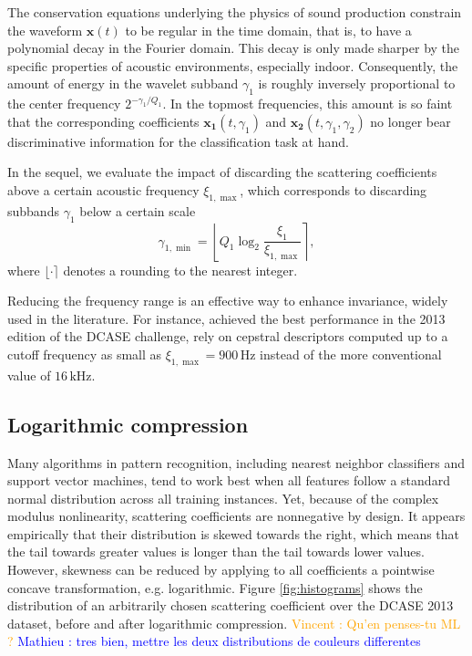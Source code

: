 \documentclass[journal]{IEEEtran}
\makeatletter
\newcommand*{\eg}{e.g.\@\xspace}
\newcommand{\vl}[1]{\textcolor{orange}{Vincent : #1}}
\newcommand{\ml}[1]{\textcolor{blue}{ Mathieu : #1}}
\makeatother
\begin{document}
The conservation equations underlying the physics of sound production constrain the waveform $\boldsymbol{x}(t)$ to be regular in the time domain, that is, to have a polynomial decay in the Fourier domain.
This decay is only made sharper by the specific properties of acoustic environments, especially indoor.
Consequently, the amount of energy in the wavelet subband $\gamma_1$ is roughly inversely proportional to the center frequency $2^{-\gamma_1/Q_1}$.
In the topmost frequencies, this amount is so faint that the corresponding coefficients $\boldsymbol{x_1}(t,\gamma_1)$ and $\boldsymbol{x_2}(t,\gamma_1,\gamma_2)$ no longer bear discriminative information for the classification task at hand.

In the sequel, we evaluate the impact of discarding the scattering coefficients above a certain acoustic frequency $\xi_{1,\max}$, which corresponds to discarding subbands $\gamma_1$ below a certain scale
\begin{equation}
\gamma_{1,\min} =
\left\lfloor Q_1 \log_2 \frac{\xi_1}{\xi_{1,\max}} \right\rceil,
\end{equation}
where $\lfloor \cdot \rceil$ denotes a rounding to the nearest integer.

Reducing the frequency range is an effective way to enhance invariance, widely used in the literature.
For instance, \cite{roma2013} achieved the best performance in the 2013 edition of the DCASE challenge, rely on cepstral descriptors computed up to a cutoff frequency as small as $\xi_{1,\max}  = 900\,\mathrm{Hz}$ instead of the more conventional value of $16\,\mathrm{kHz}$.
 
\subsection{Logarithmic compression}
Many algorithms in pattern recognition, including nearest neighbor classifiers and support vector machines, tend to work best when all features follow a standard normal distribution across all training instances.
Yet, because of the complex modulus nonlinearity, scattering coefficients are nonnegative by design.
It appears empirically that their distribution is skewed towards the right, which means that the tail towards greater values is longer than the tail towards lower values.
However, skewness can be reduced by applying to all coefficients a pointwise concave transformation, \eg logarithmic.
Figure \ref{fig:histograms} shows the distribution of an arbitrarily chosen scattering coefficient over the DCASE 2013 dataset, before and after logarithmic compression.
\vl{Qu'en penses-tu ML ?}
\ml{tres bien, mettre les deux distributions de couleurs differentes}
\end{document}
